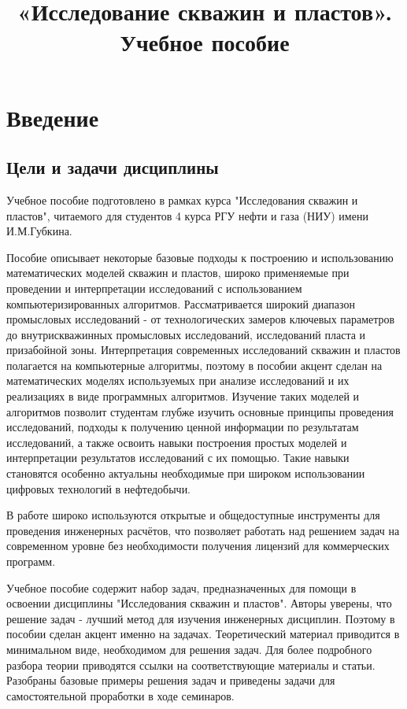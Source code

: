 \documentclass[oneside, openany]{memoir}
\begin{document}
\title{«Исследование скважин и пластов». Учебное пособие }

\maketitle

\tableofcontents{}
\chapter{Введение}

\section{Цели и задачи дисциплины}
Учебное пособие подготовлено в рамках курса "Исследования скважин и пластов", читаемого для студентов 4 курса РГУ нефти и газа (НИУ) имени И.М.Губкина. %

Пособие описывает некоторые базовые подходы к построению и использованию математических моделей скважин и пластов, широко применяемые при проведении и интерпретации исследований с использованием компьютеризированных алгоритмов. Рассматривается широкий диапазон промысловых исследований - от технологических замеров ключевых параметров до внутрискважинных промысловых исследований, исследований пласта и призабойной зоны. Интерпретация современных исследований скважин и пластов полагается на компьютерные алгоритмы, поэтому в пособии акцент сделан на математических моделях используемых при анализе исследований и их реализациях в виде программных алгоритмов. Изучение таких моделей и алгоритмов позволит студентам глубже изучить основные принципы проведения исследований, подходы к получению ценной информации по результатам исследований, а также освоить навыки построения простых моделей и интерпретации результатов исследований с их помощью. Такие навыки становятся особенно актуальны необходимые при широком использовании цифровых технологий в нефтедобычи. 

В работе широко используются открытые и общедоступные инструменты для проведения инженерных расчётов, что позволяет работать над решением задач на современном уровне без необходимости получения лицензий для коммерческих программ. 

Учебное пособие содержит набор задач, предназначенных для помощи в освоении дисциплины "Исследования скважин и пластов". Авторы уверены, что решение задач - лучший метод для изучения инженерных дисциплин. Поэтому в пособии сделан акцент именно на задачах. Теоретический материал приводится в минимальном виде, необходимом для решения задач. Для более подробного разбора теории приводятся ссылки на соответствующие материалы и статьи. Разобраны базовые примеры решения задач и приведены задачи для самостоятельной проработки в ходе семинаров. 
\end{document}
